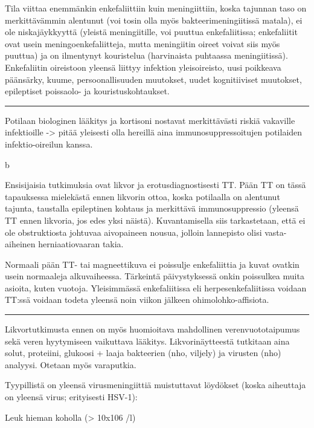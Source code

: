 \documentclass[
]{book}
\begin{document}
Tila viittaa enemmänkin enkefaliittiin kuin meningiittiin, koska tajunnan taso on merkittävämmin alentunut (voi tosin olla myös bakteerimeningiitissä matala), ei ole niskajäykkyyttä (yleistä meningiitille, voi puuttua enkefaliitissa; enkefaliitit ovat usein meningoenkefaliitteja, mutta meningiitin oireet voivat siis myös puuttua) ja on ilmentynyt kouristelua (harvinaista puhtaassa meningiitissä). Enkefaliitin oireistoon yleensä liittyy infektion yleisoireisto, uusi poikkeava päänsärky, kuume, persoonallisuuden muutokset, uudet kognitiiviset muutokset, epileptiset poissaolo- ja kouristuskohtaukset.

\begin{center}\rule{0.5\linewidth}{0.5pt}\end{center}

Potilaan biologinen lääkitys ja kortisoni nostavat merkittävästi riskiä vakaville infektioille -\textgreater{} pitää yleisesti olla hereillä aina immunosuppressoitujen potilaiden infektio-oireilun kanssa.

b

Ensisijaisia tutkimuksia ovat likvor ja erotusdiagnostisesti TT. Pään TT on tässä tapauksessa mielekästä ennen likvorin ottoa, koska potilaalla on alentunut tajunta, taustalla epileptinen kohtaus ja merkittävä immunosuppressio (yleensä TT ennen likvoria, jos edes yksi näistä). Kuvantamisella siis tarkastetaan, että ei ole obstruktiosta johtuvaa aivopaineen nousua, jolloin lannepisto olisi vasta-aiheinen herniaatiovaaran takia.

Normaali pään TT- tai magneettikuva ei poissulje enkefaliittia ja kuvat ovatkin usein normaaleja alkuvaiheessa. Tärkeintä päivystyksessä onkin poissulkea muita asioita, kuten vuotoja. Yleisimmässä enkefaliitissa eli herpesenkefaliitissa voidaan TT:ssä voidaan todeta yleensä noin viikon jälkeen ohimolohko-affisiota.

\begin{center}\rule{0.5\linewidth}{0.5pt}\end{center}

Likvortutkimusta ennen on myös huomioitava mahdollinen verenvuototaipumus sekä veren hyytymiseen vaikuttava lääkitys. Likvorinäytteestä tutkitaan aina solut, proteiini, glukoosi + laaja bakteerien (nho, viljely) ja virusten (nho) analyysi. Otetaan myös varaputkia.

Tyypillistä on yleensä virusmeningiittiä muistuttavat löydökset (koska aiheuttaja on yleensä virus; erityisesti HSV-1):

Leuk hieman koholla (\textgreater{} 10x106 /l)
\end{document}
